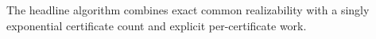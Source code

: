 The headline algorithm combines exact common realizability with a singly exponential certificate count and explicit per-certificate work.